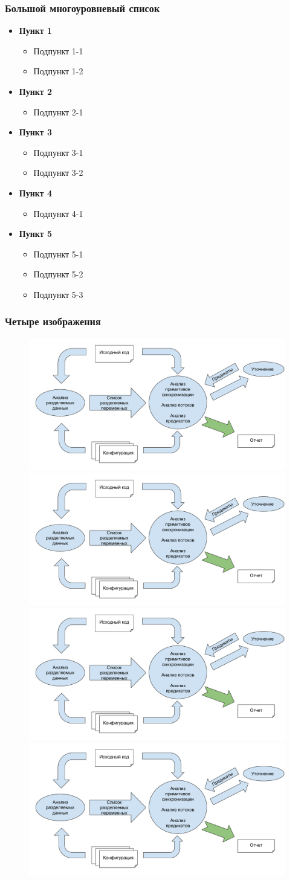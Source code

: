 \documentclass[14pt]{beamer}
\newcommand{\itemi}{\item[\checkmark]}
\begin{document}
\begin{frame}
\frametitle{Большой многоуровневый список}
\begin{itemize}
  \item \textbf{Пункт 1}
    \begin{itemize}
      \itemi Подпункт 1-1
      \itemi Подпункт 1-2
    \end{itemize}
  \item \textbf{Пункт 2}
    \begin{itemize}
      \itemi Подпункт 2-1
    \end{itemize}
  \item \textbf{Пункт 3}
    \begin{itemize}
      \itemi Подпункт 3-1
      \itemi Подпункт 3-2
    \end{itemize}
  \item \textbf{Пункт 4}
    \begin{itemize}
      \itemi Подпункт 4-1
    \end{itemize}
  \item \textbf{Пункт 5}
    \begin{itemize}
      \itemi Подпункт 5-1
      \itemi Подпункт 5-2
      \itemi Подпункт 5-3
    \end{itemize}
\end{itemize}
\end{frame}

\begin{frame}
\frametitle{Четыре изображения}
\begin{figure}[H]
  \center
    \includegraphics[width=0.4\linewidth]{MethodScheme}
    \includegraphics[width=0.4\linewidth]{MethodScheme}\\
    \includegraphics[width=0.4\linewidth]{MethodScheme}
    \includegraphics[width=0.4\linewidth]{MethodScheme}
\end{figure}
\end{frame}
\end{document}
